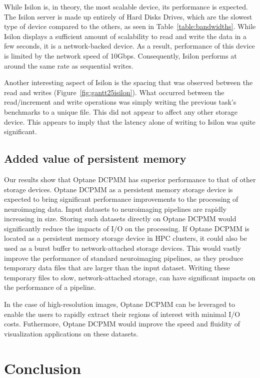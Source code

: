 \documentclass[conference]{IEEEtran}
\begin{document}
While Isilon is, in theory, the most scalable device, its performance is expected. The Isilon
server is made up entirely of Hard Disks Drives, which are the slowest type of device compared to
the others, as seen in Table~\ref{table:bandwidths}. While Isilon displays a sufficient amount of
scalability to read and write the data in a few seconds, it is a network-backed device. As a result,
performance of this device is limited by the network speed of 10Gbps. Consequently, Isilon performs at around
the same rate as sequential writes.

Another interesting aspect of Isilon is the spacing that was observed between the read and writes
(Figure~\ref{fig:gantt25isilon}). What occurred between the read/increment and
write operations was simply writing the previous task's benchmarks to a unique
file. This did not appear to affect any other storage device. This appears to imply
that the latency alone of writing to Isilon was quite significant.

\subsection{Added value of persistent memory}

Our results show that Optane DCPMM has superior performance to that of other storage devices.
Optane DCPMM as a persistent memory storage device is expected to bring significant
performance improvements to the processing of neuroimaging data. Input datasets to neuroimaging pipelines
are rapidly increasing in size. Storing such datasets directly on Optane DCPMM would significantly reduce the
impacts of I/O on the processing. If Optane DCPMM is located as a persistent memory
storage device in HPC clusters,
it could also be used as a burst buffer to network-attached storage devices. This would vastly
improve the performance of standard neuroimaging pipelines, as they produce temporary data files that 
are larger than the input dataset. Writing these temporary files to slow, network-attached storage, can have
significant impacts on the performance of a pipeline.

In the case of high-resolution images, Optane DCPMM can be leveraged to enable the users to rapidly
extract their regions of interest with minimal I/O costs. Futhermore, Optane DCPMM would improve the
speed and fluidity of visualization applications on these datasets.

\section{Conclusion}
\end{document}
